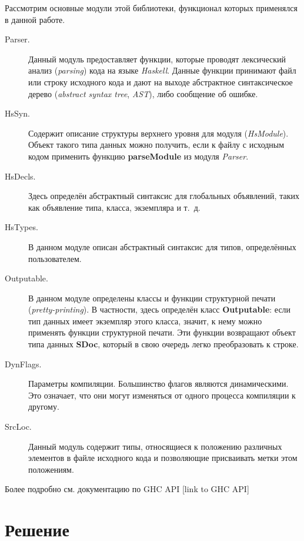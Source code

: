 Рассмотрим основные модули этой библиотеки, функционал которых применялся в данной работе.
\begin{description}
\item[Parser.] Данный модуль предоставляет функции, которые проводят лексический анализ (\textit{parsing}) кода на языке \textit{Haskell}. Данные функции принимают файл или строку исходного кода и дают на выходе абстрактное синтаксическое дерево (\textit{abstract syntax tree}, \textit{AST}), либо сообщение об ошибке.
\item[HsSyn.] Содержит описание структуры верхнего уровня для модуля (\textit{HsModule}). Объект такого типа данных можно получить, если к файлу с исходным кодом применить функцию \textbf{parseModule} из модуля \textit{Parser}.
\item[HsDecls.] Здесь определён абстрактный синтаксис для глобальных объявлений, таких как объявление типа, класса, экземпляра и т.~д.
\item[HsTypes.] В данном модуле описан абстрактный синтаксис для типов, определённых пользователем.
\item[Outputable.] В данном модуле определены классы и функции структурной печати (\textit{pretty-printing}). В частности, здесь определён класс \textbf{Outputable}: если тип данных имеет экземпляр этого класса, значит, к нему можно применять функции структурной печати. Эти функции возвращают объект типа данных \textbf{SDoc}, который в свою очередь легко преобразовать к строке.
\item[DynFlags.] Параметры компиляции. Большинство флагов являются динамическими. Это означает, что они могут изменяться от одного процесса компиляции к другому.
\item[SrcLoc.] Данный модуль содержит типы, относящиеся к положению различных элементов в файле исходного кода и позволяющие присваивать метки этом положениям. 
\end{description}

Более подробно см. документацию по GHC API [link to GHC API]

\newpage
\section{Решение}
